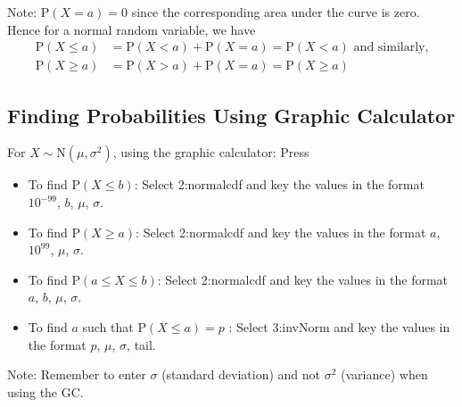 \documentclass[11pt,a4paper]{book}
\begin{document}
Note: $\text{P}\left(X=a\right)=0$ since the corresponding area under
the curve is zero. Hence for a normal random variable, we have
\begin{align*}
\text{P}\left(X\leq a\right) & =\text{P}\left(X<a\right)+\text{P}\left(X=a\right)=\text{P}\left(X<a\right)\text{ and similarly,}\\
\text{P}\left(X\geq a\right) & =\text{P}\left(X>a\right)+\text{P}\left(X=a\right)=\text{P}\left(X\geq a\right)
\end{align*}


\subsection{Finding Probabilities Using Graphic Calculator}

For $X\sim\text{N}\left(\mu,\sigma^{2}\right)$, using the graphic
calculator: Press \tcbox[box align=base,nobeforeafter,colback=blue!40, colframe=blue!40,size=small]{\textbf{\textcolor{white}{2ND}}}\tcbox[box align=base,nobeforeafter,colback=black, colframe=black,size=small]{\textbf{\textcolor{white}{VARS}}}

\begin{itemize}

\item To find $\text{P}\left(X\leq b\right)$: Select 2:normalcdf
and key the values in the format $10^{-99}$, $b$, $\mu$, $\sigma$.

\item  To find $\text{P}\left(X\geq a\right)$: Select 2:normalcdf
and key the values in the format $a$, $10^{99}$, $\mu$, $\sigma$.

\item  To find $\text{P}\left(a\leq X\leq b\right)$: Select 2:normalcdf
and key the values in the format $a$, $b$, $\mu$, $\sigma$.

\item  To find $a$ such that $\text{P}\left(X\leq a\right)=p$ :
Select 3:invNorm and key the values in the format $p$, $\mu$, $\sigma$,
tail.

\end{itemize}

Note: Remember to enter $\sigma$ (standard deviation) and not $\sigma^{2}$
(variance) when using the GC.
\end{document}
